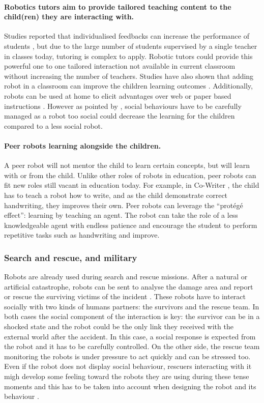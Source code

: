 	\paragraph{Robotics tutors aim to provide tailored teaching content to the child(ren) they are interacting with.} 
	Studies reported that individualised   feedbacks can increase the performance of students \citep{bloom19842}, but    due to the large number of students supervised by a single teacher in classes today, tutoring is complex to apply. Robotic tutors could provide this powerful one to one tailored interaction not available in current classroom without increasing the number of teachers. Studies have also shown that adding robot in a classroom can improve the children learning outcomes     \citep{kanda2004interactive}. Additionally, robots can be used at home to     elicit advantages over web or paper based instructions     \citep{han2005educational}. However as pointed by \citet{kennedy2015robot}, social behaviours have to be carefully managed as a robot too social could    decrease the learning for the children compared to a less social robot. 
	
	\paragraph{Peer robots learning alongside the children.}
	A peer robot will not mentor the child to learn certain concepts, but will learn with or from the child. Unlike other roles of robots in education, peer robots can fit new roles still vacant in education today. For example, in Co-Writer \citep{hood2015children}, the child has to teach a robot how to write, and as the child demonstrate correct handwriting, they improves their own. Peer robots can leverage the ``prot\'eg\'e effect'': learning by teaching an agent. The robot can take the role of a less knowledgeable agent with endless patience and encourage the student to perform repetitive tasks such as handwriting and improve.
	
\subsubsection{Search and rescue, and military} 
	
    Robots are already used during search and rescue missions. After a natural or artificial catastrophe, robots can be sent to analyse the damage area and report or rescue the surviving victims of the incident \citep{murphy2008search}. These robots have to interact socially with two kinds of humans partners: the survivors and the rescue team. In both cases the social component of the interaction is key: the survivor can be in a shocked state and the robot could be the only link they received with the external world after the accident. In this case, a social response is expected from the robot and it has to be carefully controlled. On the other side, the rescue team monitoring the robots is under pressure to act quickly and can be stressed too. Even if the robot does not display social behaviour, rescuers interacting with it migh develop some feeling toward the robots they are using during these tense moments and this has to be taken into account when designing the robot and its behaviour \citep{fincannon2004evidence}.
	
